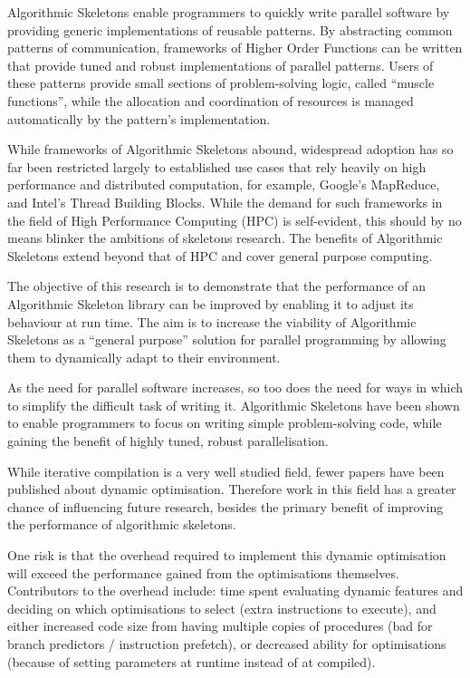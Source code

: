 Algorithmic Skeletons enable programmers to quickly write parallel
software by providing generic implementations of reusable patterns. By
abstracting common patterns of communication, frameworks of Higher
Order Functions can be written that provide tuned and robust
implementations of parallel patterns. Users of these patterns provide
small sections of problem-solving logic, called ``muscle functions'',
while the allocation and coordination of resources is managed
automatically by the pattern's implementation.

While frameworks of Algorithmic Skeletons abound, widespread adoption
has so far been restricted largely to established use cases that rely
heavily on high performance and distributed computation, for example,
Google's MapReduce, and Intel's Thread Building Blocks. While the
demand for such frameworks in the field of High Performance Computing
(HPC) is self-evident, this should by no means blinker the ambitions
of skeletons research. The benefits of Algorithmic Skeletons extend
beyond that of HPC and cover general purpose computing.

The objective of this research is to demonstrate that the performance
of an Algorithmic Skeleton library can be improved by enabling it to
adjust its behaviour at run time. The aim is to increase the viability
of Algorithmic Skeletons as a “general purpose” solution for parallel
programming by allowing them to dynamically adapt to their
environment.

As the need for parallel software increases, so too does the need for
ways in which to simplify the difficult task of writing
it. Algorithmic Skeletons have been shown to enable programmers to
focus on writing simple problem-solving code, while gaining the
benefit of highly tuned, robust parallelisation.

While iterative compilation is a very well studied field, fewer papers
have been published about dynamic optimisation. Therefore work in this
field has a greater chance of influencing future research, besides the
primary benefit of improving the performance of algorithmic skeletons.

One risk is that the overhead required to implement this dynamic
optimisation will exceed the performance gained from the optimisations
themselves. Contributors to the overhead include: time spent
evaluating dynamic features and deciding on which optimisations to
select (extra instructions to execute), and either increased code size
from having multiple copies of procedures (bad for branch predictors /
instruction prefetch), or decreased ability for optimisations (because
of setting parameters at runtime instead of at compiled).

